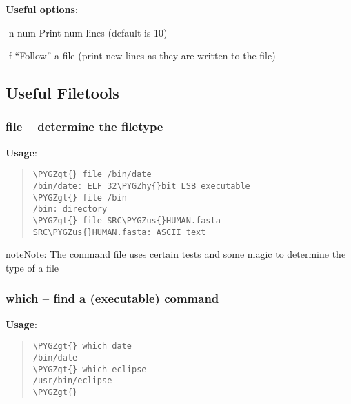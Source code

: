 \documentclass[a4paper,11pt,english]{sphinxmanual}
\def\PYGZus{\char`\_}
\def\PYGZgt{\char`\>}
\def\PYGZhy{\char`\-}
\begin{document}
\textbf{Useful options}:
\begin{optionlist}{3cm}
\item [-n num]  
Print num lines (default is 10)
\item [-f]  
``Follow'' a file (print new lines as they are written to the file)
\end{optionlist}


\subsection{Useful Filetools}
\label{introduction:useful-filetools}

\subsubsection{file – determine the filetype}
\label{introduction:file-determine-the-filetype}
\textbf{Usage}:  
\begin{quote}

\begin{Verbatim}[frame=single, rulecolor=\color{lightgray}, fontfamily=courier, commandchars=\\\{\}]
\PYGZgt{} file /bin/date
/bin/date: ELF 32\PYGZhy{}bit LSB executable
\PYGZgt{} file /bin
/bin: directory
\PYGZgt{} file SRC\PYGZus{}HUMAN.fasta
SRC\PYGZus{}HUMAN.fasta: ASCII text
\end{Verbatim}
\end{quote}

\begin{notice}{note}{Note:}
The command file uses certain tests and some magic to determine the type of a file
\end{notice}


\subsubsection{which – find a (executable) command}
\label{introduction:which-find-a-executable-command}
\textbf{Usage}:  
\begin{quote}

\begin{Verbatim}[frame=single, rulecolor=\color{lightgray}, fontfamily=courier, commandchars=\\\{\}]
\PYGZgt{} which date
/bin/date
\PYGZgt{} which eclipse
/usr/bin/eclipse
\PYGZgt{}
\end{Verbatim}
\end{quote}
\end{document}
